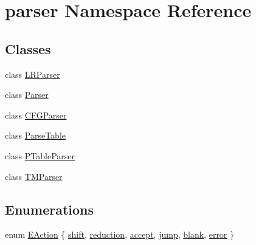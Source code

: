 \hypertarget{namespaceparser}{\section{parser \-Namespace \-Reference}
\label{d0/dd5/namespaceparser}
}
\subsection*{\-Classes}
\begin{DoxyCompactItemize}
\item 
class \hyperlink{classparser_1_1LRParser}{\-L\-R\-Parser}
\item 
class \hyperlink{classparser_1_1Parser}{\-Parser}
\item 
class \hyperlink{classparser_1_1CFGParser}{\-C\-F\-G\-Parser}
\item 
class \hyperlink{classparser_1_1ParseTable}{\-Parse\-Table}
\item 
class \hyperlink{classparser_1_1PTableParser}{\-P\-Table\-Parser}
\item 
class \hyperlink{classparser_1_1TMParser}{\-T\-M\-Parser}
\end{DoxyCompactItemize}
\subsection*{\-Enumerations}
\begin{DoxyCompactItemize}
\item 
enum \hyperlink{namespaceparser_a7a838229f5b5b20f185dfad9d362dbed}{\-E\-Action} \{ \*
\hyperlink{namespaceparser_a7a838229f5b5b20f185dfad9d362dbedaa0b431997906e4d0c453d7ba0fe1c744}{shift}, 
\hyperlink{namespaceparser_a7a838229f5b5b20f185dfad9d362dbeda175b62b0686c65910f72c0c4b7ff2c86}{reduction}, 
\hyperlink{namespaceparser_a7a838229f5b5b20f185dfad9d362dbedab009f2af27ebdb5b6829ee1614826576}{accept}, 
\hyperlink{namespaceparser_a7a838229f5b5b20f185dfad9d362dbedacce7c4f977d7145f234fd8f2691dab61}{jump}, 
\*
\hyperlink{namespaceparser_a7a838229f5b5b20f185dfad9d362dbeda0c4197e3086acf7d33bcf1a943d4754c}{blank}, 
\hyperlink{namespaceparser_a7a838229f5b5b20f185dfad9d362dbedaa02231033cc9e46e39eff451b2aeafb9}{error}
 \}
\end{DoxyCompactItemize}


